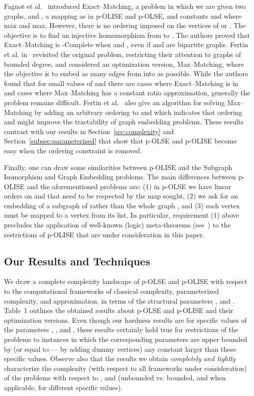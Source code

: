 \documentclass[11pt]{article}
\newcommand{\NP}{\mbox{}}
\begin{document}
Fagnot et al.~\cite{Fagnot2008178} introduced {\textsc Exact--Matching}, a problem in which we are given two graphs,  and , a mapping  as in p-OLISE and p-OLSE, and constants  and  where max and max. However,  there is no ordering imposed on the vertices of  or .  The objective is to find an injective homomorphism from  to . The authors proved that {\textsc Exact--Matching} is \NP-Complete when  and , even if  and  are bipartite graphs.  Fertin et al. in~\cite{Fertin2005,Fertin2009} revisited the original problem, restricting their attention to graphs of bounded degree, and considered an optimization version, {\textsc Max--Matching}, where the objective is to embed as many edges from  into  as possible. While the authors found that for small values of  and  there are cases where {\textsc Exact--Matching} is in  and cases where {\textsc Max--Matching} has a constant ratio approximation, generally the problem remains difficult. Fertin et al.~\cite{Fertin2005,Fertin2009} also give an  algorithm for solving {\textsc Max--Matching} by adding an arbitrary ordering to  and  which indicates that ordering  and  might improve the tractability of graph embedding problems. These results contrast with our results in Section~\ref{sec:complexity} and Section~\ref{subsec:parameterized} that show that p-OLSE and p-OLISE become easy when the ordering constraint is removed.

Finally, one can draw some similarities between p-OLISE and the {\sc Subgraph Isomorphism} and {\sc Graph Embedding} problems. The main differences between p-OLISE and the aforementioned problems are: (1) in p-OLSE we have linear orders on  and  that need to be respected by the map sought, (2) we ask for an embedding of a subgraph of  rather than the whole graph , and (3) each vertex must be mapped to a vertex from its list. In particular, requirement (1) above precludes the application of well-known (logic) meta-theorems (see~\cite{grohebook}) to the restrictions of p-OLISE that are under consideration in this paper.

\subsection{Our Results and Techniques}\label{subsec:results}
We draw a complete complexity landscape of p-OLSE and p-OLISE with respect to the computational frameworks of classical complexity, parameterized complexity, and approximation, in terms of the structural parameters ,  and . Table~1 outlines the obtained results about p-OLSE and p-OLISE and their optimization versions. Even though our hardness results are for specific values of the parameters , , and , these results certainly hold true for restrictions of the problems to instances in which the corresponding parameters are upper bounded by (or equal to --- by adding dummy vertices) any constant larger than these specific values. Observe also that the results we obtain {\em completely and tightly} characterize the complexity (with respect to all frameworks under consideration) of the problems with respect to ,  and  (unbounded vs. bounded, and when applicable, for different specific values).
\end{document}
